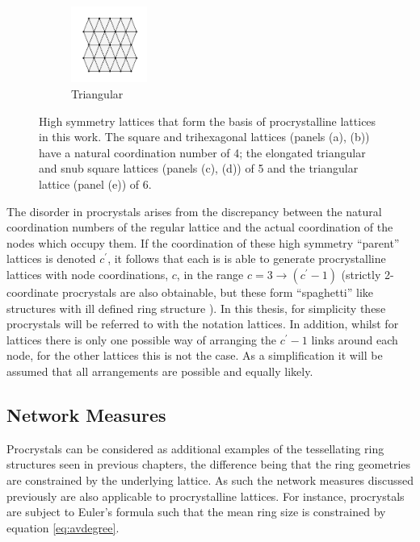 \begin{figure}[bt]
     \vspace{0.5cm}
     \begin{subfigure}[b]{0.3\textwidth}
         \centering
         \includegraphics[height=2.5cm]{./figures/procrystals/tri.pdf}
         \caption{Triangular}
         \label{fig:symlattri}
     \end{subfigure}
     \hfill

     \caption{High symmetry lattices that form the basis of \td{} procrystalline lattices in this work. The square and trihexagonal lattices (panels (a), (b)) have a natural coordination number of 4; the elongated triangular and snub square lattices (panels (c), (d))  of 5 and the triangular lattice (panel (e)) of 6.}
     \label{fig:symlat}
\end{figure}

The disorder in procrystals arises from the discrepancy between the natural coordination numbers of the regular lattice and the actual coordination of the nodes which occupy them.
If the coordination of these high symmetry ``parent'' lattices is denoted $c^\prime$, it follows that each is is able to generate procrystalline lattices with node coordinations, $c$, in the range $c=3\rightarrow \left(c^\prime-1\right)$ (strictly 2\--coordinate procrystals are also obtainable, but these form ``spaghetti'' like structures with ill defined ring structure \cite{Baise2018}).
In this thesis, for simplicity these procrystals will be referred to with the notation lattices.
In addition, whilst for lattices there is only one possible way of arranging the $c^\prime-1$ links around each node, for the other lattices this is not the case.
As a simplification it will be assumed that all arrangements are possible and equally likely.

\subsection{Network Measures}

Procrystals can be considered as additional examples of the tessellating ring structures seen in previous chapters, the difference being that the ring geometries are constrained by the underlying lattice. 
As such the network measures discussed previously are also applicable to procrystalline lattices.  
For instance, procrystals are subject to Euler's formula such that the mean ring size is constrained by equation \eqref{eq:avdegree}.

